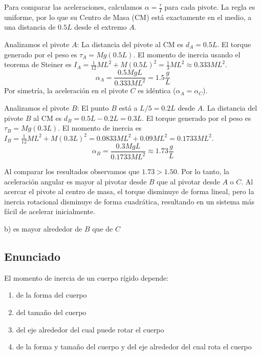 \documentclass[12pt, a4paper]{article}
\begin{document}
Para comparar las aceleraciones, calculamos $\alpha = \frac{\tau}{I}$ para cada pivote. La regla es uniforme, por lo que su Centro de Masa (CM) está exactamente en el medio, a una distancia de $0.5L$ desde el extremo $A$.

Analizamos el pivote $A$:
La distancia del pivote al CM es $d_A = 0.5L$.
El torque generado por el peso es $\tau_A = Mg(0.5L)$.
El momento de inercia usando el teorema de Steiner es $I_A = \frac{1}{12}ML^2 + M(0.5L)^2 = \frac{1}{3}ML^2 \approx 0.333ML^2$.
$$\alpha_A = \frac{0.5MgL}{0.333ML^2} = 1.5 \frac{g}{L}$$
Por simetría, la aceleración en el pivote $C$ es idéntica ($\alpha_A = \alpha_C$).

Analizamos el pivote $B$:
El punto $B$ está a $L/5 = 0.2L$ desde $A$. La distancia del pivote $B$ al CM es $d_B = 0.5L - 0.2L = 0.3L$.
El torque generado por el peso es $\tau_B = Mg(0.3L)$.
El momento de inercia es $I_B = \frac{1}{12}ML^2 + M(0.3L)^2 = 0.0833ML^2 + 0.09ML^2 = 0.1733ML^2$.
$$\alpha_B = \frac{0.3MgL}{0.1733ML^2} \approx 1.73 \frac{g}{L}$$

Al comparar los resultados observamos que $1.73 > 1.50$. Por lo tanto, la aceleración angular es mayor al pivotar desde $B$ que al pivotar desde $A$ o $C$. Al acercar el pivote al centro de masa, el torque disminuye de forma lineal, pero la inercia rotacional disminuye de forma cuadrática, resultando en un sistema más fácil de acelerar inicialmente.

\begin{tcolorbox}[colback=green!5!white, colframe=green!50!black, title=Respuesta Final]
\centering \Large b) es mayor alrededor de $B$ que de $C$
\end{tcolorbox}

\newpage

\subsection*{Enunciado}
El momento de inercia de un cuerpo rígido depende:
\begin{enumerate}[label=\alph*)]
    \item de la forma del cuerpo
    \item del tamaño del cuerpo
    \item del eje alrededor del cual puede rotar el cuerpo
    \item de la forma y tamaño del cuerpo y del eje alrededor del cual rota el cuerpo
\end{enumerate}
\end{document}
